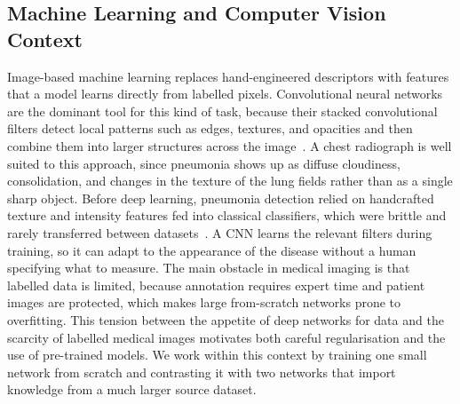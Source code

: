 \documentclass[preprint,12pt]{elsarticle}
\begin{document}
\subsection{Machine Learning and Computer Vision Context}
Image-based machine learning replaces hand-engineered descriptors with features that a model learns directly from labelled pixels.
Convolutional neural networks are the dominant tool for this kind of task, because their stacked convolutional filters detect local patterns such as edges, textures, and opacities and then combine them into larger structures across the image~\cite{guleria2024systematic}.
A chest radiograph is well suited to this approach, since pneumonia shows up as diffuse cloudiness, consolidation, and changes in the texture of the lung fields rather than as a single sharp object.
Before deep learning, pneumonia detection relied on handcrafted texture and intensity features fed into classical classifiers, which were brittle and rarely transferred between datasets~\cite{aitnasser2023review}.
A CNN learns the relevant filters during training, so it can adapt to the appearance of the disease without a human specifying what to measure.
The main obstacle in medical imaging is that labelled data is limited, because annotation requires expert time and patient images are protected, which makes large from-scratch networks prone to overfitting.
This tension between the appetite of deep networks for data and the scarcity of labelled medical images motivates both careful regularisation and the use of pre-trained models.
We work within this context by training one small network from scratch and contrasting it with two networks that import knowledge from a much larger source dataset.
\end{document}
